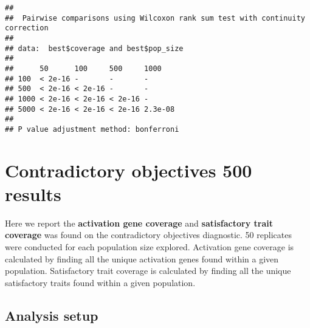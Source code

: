 \documentclass[
]{book}
\newenvironment{Shaded}{\begin{snugshade}}{\end{snugshade}}
\newcommand{\AttributeTok}[1]{\textcolor[rgb]{0.13,0.29,0.53}{#1}}
\newcommand{\CommentTok}[1]{\textcolor[rgb]{0.56,0.35,0.01}{\textit{#1}}}
\newcommand{\ConstantTok}[1]{\textcolor[rgb]{0.56,0.35,0.01}{#1}}
\newcommand{\FunctionTok}[1]{\textcolor[rgb]{0.13,0.29,0.53}{\textbf{#1}}}
\newcommand{\NormalTok}[1]{#1}
\newcommand{\OtherTok}[1]{\textcolor[rgb]{0.56,0.35,0.01}{#1}}
\newcommand{\SpecialCharTok}[1]{\textcolor[rgb]{0.81,0.36,0.00}{\textbf{#1}}}
\newcommand{\StringTok}[1]{\textcolor[rgb]{0.31,0.60,0.02}{#1}}
\begin{document}
\begin{verbatim}
## 
##  Pairwise comparisons using Wilcoxon rank sum test with continuity correction 
## 
## data:  best$coverage and best$pop_size 
## 
##      50      100     500     1000   
## 100  < 2e-16 -       -       -      
## 500  < 2e-16 < 2e-16 -       -      
## 1000 < 2e-16 < 2e-16 < 2e-16 -      
## 5000 < 2e-16 < 2e-16 < 2e-16 2.3e-08
## 
## P value adjustment method: bonferroni
\end{verbatim}

\hypertarget{contradictory-objectives-500-results}{%
\chapter{Contradictory objectives 500 results}\label{contradictory-objectives-500-results}}

Here we report the \textbf{activation gene coverage} and \textbf{satisfactory trait coverage} was found on the contradictory objectives diagnostic.
50 replicates were conducted for each population size explored.
Activation gene coverage is calculated by finding all the unique activation genes found within a given population.
Satisfactory trait coverage is calculated by finding all the unique satisfactory traits found within a given population.

\hypertarget{analysis-setup-4}{%
\section{Analysis setup}\label{analysis-setup-4}}

\begin{Shaded}
\end{Shaded}
\end{document}
